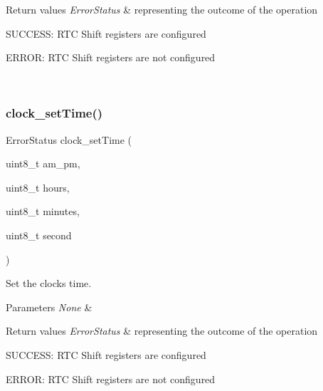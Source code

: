 \begin{DoxyRetVals}{Return values}
{\em Error\+Status} & representing the outcome of the operation
\begin{DoxyItemize}
\item S\+U\+C\+C\+E\+SS\+: R\+TC Shift registers are configured
\item E\+R\+R\+OR\+: R\+TC Shift registers are not configured 
\end{DoxyItemize}\\
\hline
\end{DoxyRetVals}
\mbox{\label{group___time___date_ga11404197d58ddf6b46230bcde4282ef2}} 
\subsubsection{\texorpdfstring{clock\+\_\+set\+Time()}{clock\_setTime()}}
{\footnotesize\ttfamily Error\+Status clock\+\_\+set\+Time (\begin{DoxyParamCaption}\item[{uint8\+\_\+t}]{am\+\_\+pm,  }\item[{uint8\+\_\+t}]{hours,  }\item[{uint8\+\_\+t}]{minutes,  }\item[{uint8\+\_\+t}]{second }\end{DoxyParamCaption})}



Set the clock\textquotesingle{}s time. 


\begin{DoxyParams}{Parameters}
{\em None} & \\
\hline
\end{DoxyParams}

\begin{DoxyRetVals}{Return values}
{\em Error\+Status} & representing the outcome of the operation
\begin{DoxyItemize}
\item S\+U\+C\+C\+E\+SS\+: R\+TC Shift registers are configured
\item E\+R\+R\+OR\+: R\+TC Shift registers are not configured 
\end{DoxyItemize}\\
\hline
\end{DoxyRetVals}
